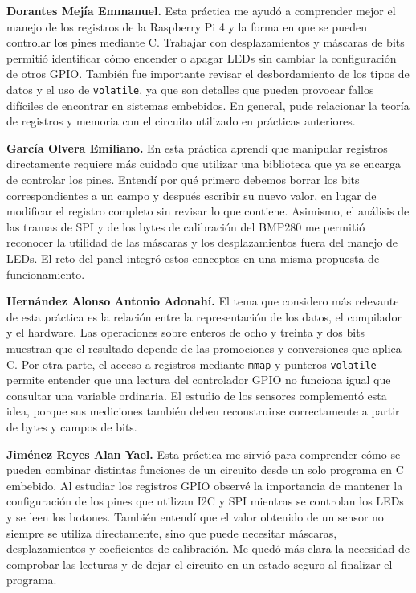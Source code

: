 \documentclass[conference]{IEEEtran}
\begin{document}
\textbf{Dorantes Mejía Emmanuel.} Esta práctica me ayudó a comprender mejor el manejo de los registros de la Raspberry Pi 4 y la forma en que se pueden controlar los pines mediante C. Trabajar con desplazamientos y máscaras de bits permitió identificar cómo encender o apagar LEDs sin cambiar la configuración de otros GPIO. También fue importante revisar el desbordamiento de los tipos de datos y el uso de \texttt{volatile}, ya que son detalles que pueden provocar fallos difíciles de encontrar en sistemas embebidos. En general, pude relacionar la teoría de registros y memoria con el circuito utilizado en prácticas anteriores.

\textbf{García Olvera Emiliano.} En esta práctica aprendí que manipular registros directamente requiere más cuidado que utilizar una biblioteca que ya se encarga de controlar los pines. Entendí por qué primero debemos borrar los bits correspondientes a un campo y después escribir su nuevo valor, en lugar de modificar el registro completo sin revisar lo que contiene. Asimismo, el análisis de las tramas de SPI y de los bytes de calibración del BMP280 me permitió reconocer la utilidad de las máscaras y los desplazamientos fuera del manejo de LEDs. El reto del panel integró estos conceptos en una misma propuesta de funcionamiento.

\textbf{Hernández Alonso Antonio Adonahí.} El tema que considero más relevante de esta práctica es la relación entre la representación de los datos, el compilador y el hardware. Las operaciones sobre enteros de ocho y treinta y dos bits muestran que el resultado depende de las promociones y conversiones que aplica C. Por otra parte, el acceso a registros mediante \texttt{mmap} y punteros \texttt{volatile} permite entender que una lectura del controlador GPIO no funciona igual que consultar una variable ordinaria. El estudio de los sensores complementó esta idea, porque sus mediciones también deben reconstruirse correctamente a partir de bytes y campos de bits.

\textbf{Jiménez Reyes Alan Yael.} Esta práctica me sirvió para comprender cómo se pueden combinar distintas funciones de un circuito desde un solo programa en C embebido. Al estudiar los registros GPIO observé la importancia de mantener la configuración de los pines que utilizan I2C y SPI mientras se controlan los LEDs y se leen los botones. También entendí que el valor obtenido de un sensor no siempre se utiliza directamente, sino que puede necesitar máscaras, desplazamientos y coeficientes de calibración. Me quedó más clara la necesidad de comprobar las lecturas y de dejar el circuito en un estado seguro al finalizar el programa.
\end{document}
